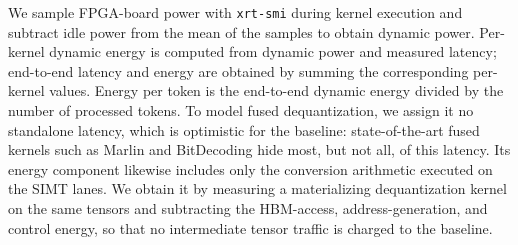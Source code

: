 \documentclass[sigconf,anonymous,nonacm]{acmart}
\begin{document}
We sample FPGA-board power with \texttt{xrt-smi} during kernel execution and subtract idle power from the mean of the samples to obtain dynamic power. Per-kernel dynamic energy is computed from dynamic power and measured latency; end-to-end latency and energy are obtained by summing the corresponding per-kernel values. Energy per token is the end-to-end dynamic energy divided by the number of processed tokens.
To model fused dequantization, we assign it no standalone latency, which is optimistic for the baseline: state-of-the-art fused kernels such as Marlin\cite{marlin} and BitDecoding\cite{bitdecoding} hide most, but not all, of this latency. Its energy component likewise includes only the conversion arithmetic executed on the SIMT lanes. We obtain it by measuring a materializing dequantization kernel on the same tensors and subtracting the HBM-access, address-generation, and control energy, so that no intermediate tensor traffic is charged to the baseline.
\end{document}

